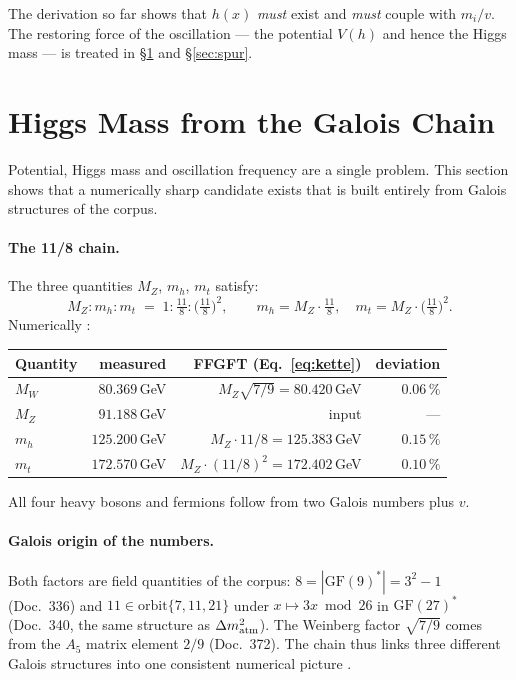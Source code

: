 The derivation so far shows that $h(x)$ \emph{must} exist and \emph{must}
couple with $m_i/v$. The restoring force of the oscillation --- the
potential $V(h)$ and hence the Higgs mass --- is treated in
§\ref{sec:higgsmasse} and §\ref{sec:spur}.

\section{Higgs Mass from the Galois Chain \KM}
\label{sec:higgsmasse}

Potential, Higgs mass and oscillation frequency are a single problem. This
section shows that a numerically sharp candidate exists that is built
entirely from Galois structures of the corpus.

\paragraph{The 11/8 chain.}
The three quantities $M_Z$, $m_h$, $m_t$ satisfy:
\begin{equation}
  M_Z : m_h : m_t \;=\; 1 : \tfrac{11}{8} : \bigl(\tfrac{11}{8}\bigr)^2,
  \qquad
  m_h = M_Z\cdot\tfrac{11}{8}, \quad m_t = M_Z\cdot\bigl(\tfrac{11}{8}\bigr)^2.
  \label{eq:kette}
\end{equation}
Numerically \KM:
\begin{center}
\small\begin{tabular}{@{}lrrr@{}}
\toprule
Quantity & measured & FFGFT (Eq.~\eqref{eq:kette}) & deviation \\
\midrule
$M_W$ & $80.369$\,GeV & $M_Z\sqrt{7/9} = 80.420$\,GeV & $0.06\,\%$ \\
$M_Z$ & $91.188$\,GeV & input & --- \\
$m_h$ & $125.200$\,GeV & $M_Z\cdot11/8 = 125.383$\,GeV & $0.15\,\%$ \\
$m_t$ & $172.570$\,GeV & $M_Z\cdot(11/8)^2 = 172.402$\,GeV & $0.10\,\%$ \\
\bottomrule
\end{tabular}
\end{center}
All four heavy bosons and fermions follow from two Galois numbers plus $v$.

\paragraph{Galois origin of the numbers.}
Both factors are field quantities of the corpus:
$8 = |\mathrm{GF}(9)^*| = 3^2 - 1$ (Doc.~336) and
$11 \in \text{orbit}\{7,11,21\}$ under $x\mapsto 3x \bmod 26$
in $\mathrm{GF}(27)^*$ (Doc.~340, the same structure as $\Delta m^2_{\rm atm}$).
The Weinberg factor $\sqrt{7/9}$ comes from the $A_5$ matrix element $2/9$
(Doc.~372). The chain thus links three different Galois structures into
one consistent numerical picture \KM.

